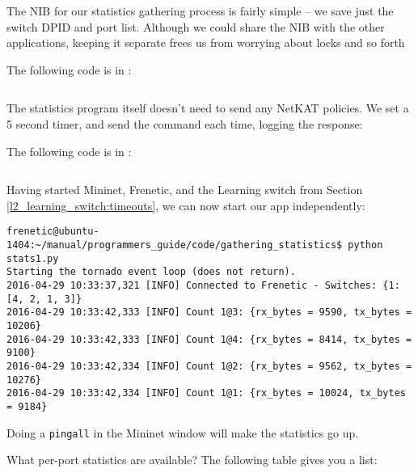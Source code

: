 The NIB for our statistics gathering process is fairly simple -- we save just the switch DPID and 
port list.  Although we could share the NIB with the other applications, keeping it separate frees us
from worrying about locks and so forth

The following code is in :

\inputminted{python}{code/gathering_statistics/network_information_base.py}

The statistics program itself doesn't need to send any NetKAT policies.  We set a 5 second timer,
and send the  command each time, logging the response:

The following code is in :

\inputminted{python}{code/gathering_statistics/stats1.py}

Having started Mininet, Frenetic, and the Learning switch  from Section 
\ref{l2_learning_switch:timeouts}, we can now start our app independently:

\begin{verbatim}
frenetic@ubuntu-1404:~/manual/programmers_guide/code/gathering_statistics$ python stats1.py
Starting the tornado event loop (does not return).
2016-04-29 10:33:37,321 [INFO] Connected to Frenetic - Switches: {1: [4, 2, 1, 3]}
2016-04-29 10:33:42,333 [INFO] Count 1@3: {rx_bytes = 9590, tx_bytes = 10206}
2016-04-29 10:33:42,333 [INFO] Count 1@4: {rx_bytes = 8414, tx_bytes = 9100}
2016-04-29 10:33:42,334 [INFO] Count 1@2: {rx_bytes = 9562, tx_bytes = 10276}
2016-04-29 10:33:42,334 [INFO] Count 1@1: {rx_bytes = 10024, tx_bytes = 9184}
\end{verbatim}

Doing a \texttt{pingall} in the Mininet window will make the statistics go up.

What per-port statistics are available?  The following table gives you a list:

